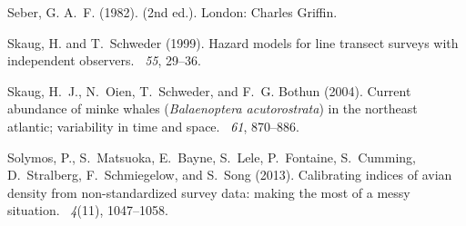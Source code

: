 \documentclass[useAMS,usenatbib,referee]{biom}
\begin{document}
\begin{thebibliography}{}
Seber, G. A.~F. (1982).
  (2nd ed.).
\newblock London: Charles Griffin.

Skaug, H. and T.~Schweder (1999).
\newblock Hazard models for line transect surveys with independent observers.
~{\em 55}, 29--36.

Skaug, H.~J., N.~Oien, T.~Schweder, and F.~G. Bothun (2004).
\newblock Current abundance of minke whales ({\em Balaenoptera acutorostrata})
  in the northeast atlantic; variability in time and space.
~{\em 61},
  870--886.

Solymos, P., S.~Matsuoka, E.~Bayne, S.~Lele, P.~Fontaine, S.~Cumming,
  D.~Stralberg, F.~Schmiegelow, and S.~Song (2013).
\newblock Calibrating indices of avian density from non-standardized survey
  data: making the most of a messy situation.
~{\em 4\/}(11), 1047--1058.

\end{thebibliography}
\end{document}
